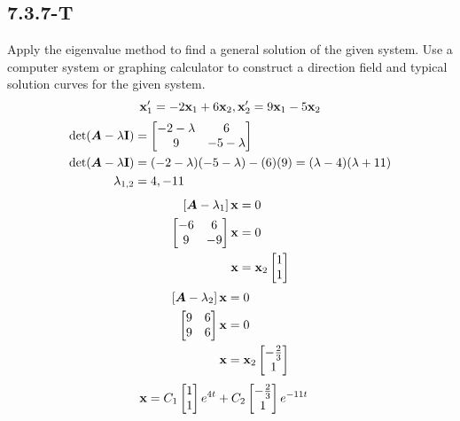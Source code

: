 \documentclass{article}
\begin{document}
\subsection{7.3.7-T}

Apply the eigenvalue method to find a general solution of the given system. Use a computer system or graphing calculator to construct a direction field and typical solution curves for the given system.
\begin{equation*}
	\vect{x}'_1 = -2\vect{x}_1 + 6\vect{x}_2, \vect{x}'_2 = 9\vect{x}_1 - 5\vect{x}_2
\end{equation*}
\begin{align*}
	\det( \matr{A} - \lambda \vect{I} ) & =
		\begin{bmatrix}
			-2 - \lambda & 6 \\
			9 & -5 - \lambda
		\end{bmatrix} \\
	\det( \matr{A} - \lambda \vect{I} ) & =
		(-2 - \lambda)(-5 - \lambda) - (6)(9) = (\lambda - 4)(\lambda + 11) \\
	\lambda_{1,2} & = 4, -11
\end{align*}
\begin{align*}
	\left[ \matr{A} - \lambda_1 \right] \vect{x} & = 0 \\
	\begin{bmatrix}
		-6 & 6 \\
		9 & -9
	\end{bmatrix} \vect{x} & = 0 \\
	\vect{x} & = \vect{x}_2 \begin{bmatrix} 1 \\ 1 \end{bmatrix}
\end{align*}
\begin{align*}
	\left[ \matr{A} - \lambda_2 \right] \vect{x} & = 0 \\
	\begin{bmatrix}
		9 & 6 \\
		9 & 6
	\end{bmatrix} \vect{x} & = 0 \\
	\vect{x} & = \vect{x}_2 \begin{bmatrix} -\frac{2}{3} \\ 1 \end{bmatrix}
\end{align*}
\begin{align*}
	\vect{x} & = C_1 \begin{bmatrix} 1 \\ 1 \end{bmatrix} e^{4t} + C_2 \begin{bmatrix} -\frac{2}{3} \\ 1 \end{bmatrix} e^{-11t}
\end{align*}
\end{document}
